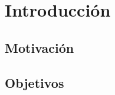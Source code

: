 \renewcommand{\dir}{assets/images/capitulos}
\renewcommand{\nchapter}{0}



\chapter[Introducción]{Introducción}



\section{Motivación}


\section{Objetivos}


